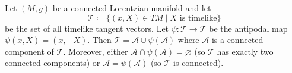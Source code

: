 Let $(M, g)$ be a connected Lorentzian manifold and let
$$\mathcal{T} \coloneqq \{ (x, X) \in TM \mid X \text{ is timelike} \}$$
be the set of all timelike tangent vectors. Let $\psi: \mathcal{T} \to \mathcal{T}$ be the antipodal map $\psi(x, X) = (x, -X)$. Then $\mathcal{T} = \mathcal{A} \cup \psi(\mathcal{A})$ where $\mathcal{A}$ is a connected component of $\mathcal{T}$. Moreover, either $\mathcal{A} \cap \psi(\mathcal{A}) = \varnothing$ (so $\mathcal{T}$ has exactly two connected components) or $\mathcal{A} = \psi(\mathcal{A})$ (so $\mathcal{T}$ is connected).
